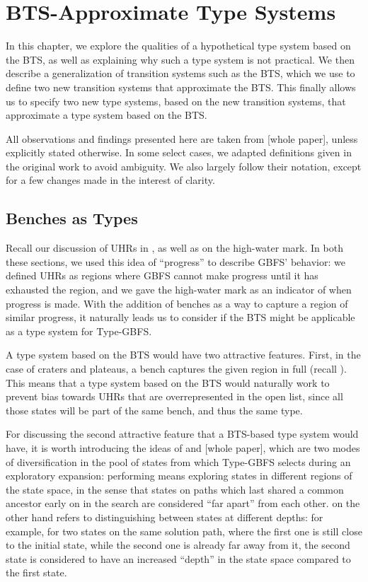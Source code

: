 \chapter{BTS-Approximate Type Systems}

In this chapter, we explore the qualities of a hypothetical type system based on the BTS, as well as explaining why such a type system is not practical. We then describe a generalization of transition systems such as the BTS, which we use to define two new transition systems that approximate the BTS. This finally allows us to specify two new type systems, based on the new transition systems, that approximate a type system based on the BTS.

All observations and findings presented here are taken from [whole paper], unless explicitly stated otherwise. In some select cases, we adapted definitions given in the original work to avoid ambiguity. We also largely follow their notation, except for a few changes made in the interest of clarity.

\section{Benches as Types}
\label{sec:bench-types}

Recall our discussion of UHRs in , as well as  on the high-water mark. In both these sections, we used this idea of ``progress'' to describe GBFS' behavior: we defined UHRs as regions where GBFS cannot make progress until it has exhausted the region, and we gave the high-water mark as an indicator of when progress is made. With the addition of benches as a way to capture a region of similar progress, it naturally leads us to consider if the BTS might be applicable as a type system for Type-GBFS.

A type system based on the BTS would have two attractive features. First, in the case of craters and plateaus, a bench captures the given region in full (recall ). This means that a type system based on the BTS would naturally work to prevent bias towards UHRs that are overrepresented in the open list, since all those states will be part of the same bench, and thus the same type.

For discussing the second attractive feature that a BTS-based type system would have, it is worth introducing the ideas of  and  [whole paper], which are two modes of diversification in the pool of states from which Type-GBFS selects during an exploratory expansion: performing  means exploring states in different regions of the state space, in the sense that states on paths which last shared a common ancestor early on in the search are considered ``far apart'' from each other.  on the other hand refers to distinguishing between states at different depths: for example, for two states on the same solution path, where the first one is still close to the initial state, while the second one is already far away from it, the second state is considered to have an increased ``depth'' in the state space compared to the first state.

